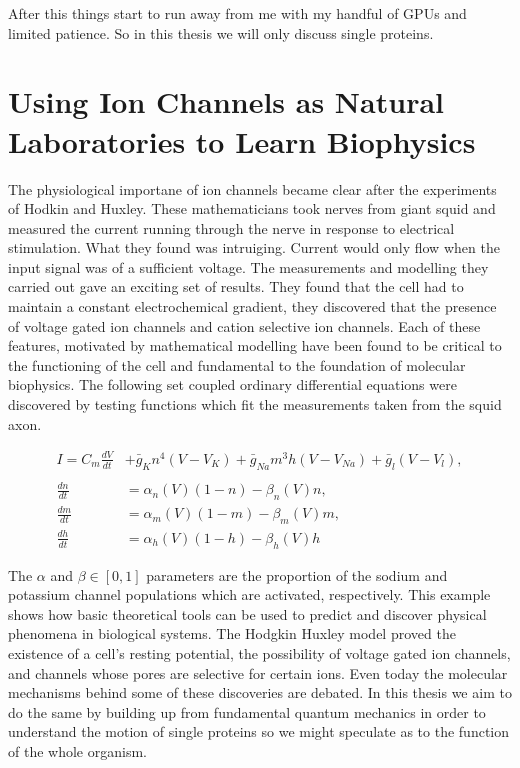After this things start to run away from me with my handful of GPUs and limited patience. So in this thesis we will only discuss single proteins.


\section{Using Ion Channels as Natural Laboratories to Learn Biophysics}
The physiological importane of ion channels became clear after the experiments of Hodkin and Huxley. These mathematicians took nerves from giant squid and measured the current running through the nerve in response to electrical stimulation. What they found was intruiging. Current would only flow when the input signal was of a sufficient voltage. The measurements and modelling they carried out gave an exciting set of results. They found that the cell had to maintain a constant electrochemical gradient, they discovered that the presence of voltage gated ion channels and cation selective ion channels\cite{hodgkin1952}. Each of these features, motivated by mathematical modelling have been found to be critical to the functioning of the cell and fundamental to the foundation of molecular biophysics. The following set coupled ordinary differential equations were discovered by testing functions which fit the measurements taken from the squid axon.   

\begin{equation}
\begin{aligned}
	I = C_m \frac{dV}{dt} &+ \bar{g}_K n^4 (V - V_K) + \bar{g}_{Na} m^3 h (V - V_{Na} ) + \bar{g}_l (V-V_l) ,  \\ \\
	\frac{dn}{dt} &= \alpha_n(V)  (1-n) - \beta_n(V)  n, \\
	\frac{dm}{dt} &= \alpha_m(V)  (1-m) - \beta_m(V)  m, \\ 
	\frac{dh}{dt} &= \alpha_h(V)  (1-h) - \beta_h(V)  h  
\end{aligned}
\end{equation}

The $\alpha$ and $\beta \in [0,1]$ parameters are the proportion of the sodium and potassium channel populations which are activated, respectively.  This example shows how basic theoretical tools can be used to predict and discover physical phenomena in biological systems. The Hodgkin Huxley model proved the existence of a cell's resting potential, the possibility of voltage gated ion channels, and channels whose pores are selective for certain ions. Even today the molecular mechanisms behind some of these discoveries are debated. In this thesis we aim to do the same by building up from fundamental quantum mechanics in order to understand the motion of single proteins so we might speculate as to the function of the whole organism.


